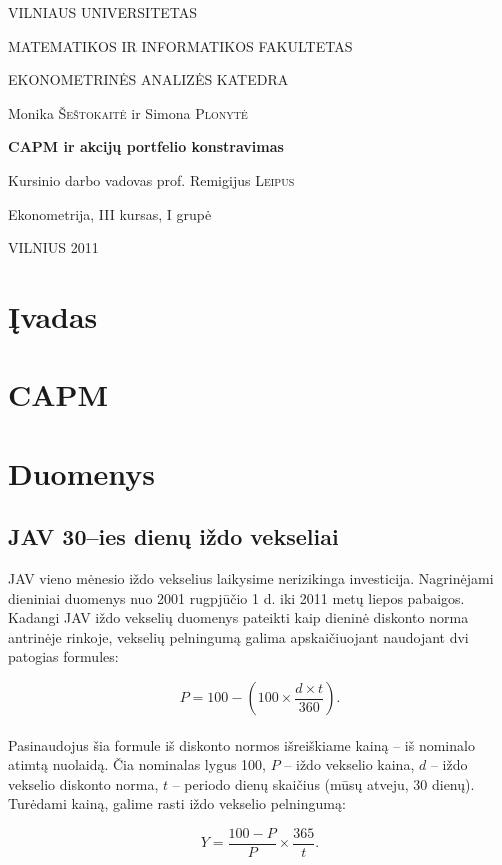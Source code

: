 \documentclass[12pt, a14paper, lithuanian]{article}
\begin{document}
\begin{titlepage}
\centerline{ \large VILNIAUS UNIVERSITETAS}
\bigskip
\centerline{\large MATEMATIKOS IR INFORMATIKOS FAKULTETAS}
\smallskip

\centerline{\large  EKONOMETRINĖS ANALIZĖS KATEDRA}
\vskip 200pt
\centerline{ \large Monika \textsc{Šeštokaitė} ir \large Simona \textsc{Plonytė}}
\vskip 50pt
\centerline{\bf \Large CAPM ir akcijų portfelio konstravimas}
\bigskip
\vskip 25pt
\centerline{Kursinio darbo vadovas prof. \large {Remigijus} \textsc{Leipus}}
\vskip 25pt
\hfill Ekonometrija, III kursas, I grupė
\vskip 100pt
\centerline{\large VILNIUS 2011}
\end{titlepage}



\tableofcontents
\newpage



\section{Įvadas}
\newpage
\section{CAPM}
\newpage
\section{Duomenys}
\subsection{JAV 30--ies dienų iždo vekseliai}

JAV vieno mėnesio iždo vekselius laikysime nerizikinga investicija. Nagrinėjami dieniniai duomenys nuo 2001 rugpjūčio 1 d. iki 2011 metų liepos pabaigos.
Kadangi JAV iždo vekselių duomenys pateikti kaip dieninė diskonto norma antrinėje rinkoje, vekselių pelningumą galima apskaičiuojant naudojant dvi patogias formules:


$$P = 100 - \left( 100 \times \frac{d \times t}{360}\right) .$$\\

Pasinaudojus šia formule iš diskonto normos išreiškiame kainą -- iš nominalo atimtą nuolaidą. 
Čia nominalas lygus 100, $P$ -- iždo vekselio kaina, $d$ -- iždo vekselio diskonto norma,
$t$ -- periodo dienų skaičius (mūsų atveju, 30 dienų). 
Turėdami kainą, galime rasti iždo vekselio pelningumą:

$$Y = \frac{100 - P}{P} \times \frac{365}{t}.$$\\
\end{document}
